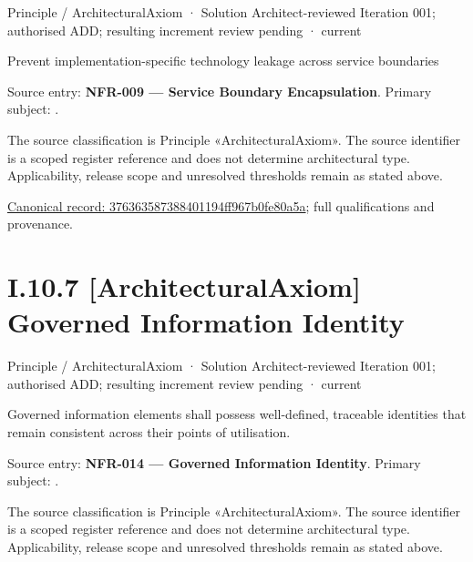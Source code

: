 \label{element:376363587388401194ff967b0fe80a5a}
{\small Principle / ArchitecturalAxiom · Solution Architect-reviewed Iteration 001; authorised ADD; resulting increment review pending · current}\par

Prevent implementation-specific technology leakage across service boundaries



Source entry: \textbf{NFR-009 — Service Boundary Encapsulation}. Primary subject: \texttt{}.



The source classification is Principle «ArchitecturalAxiom». The source identifier is a scoped register reference and does not determine architectural type. Applicability, release scope and unresolved thresholds remain as stated above.


{\footnotesize \href{../../../../../../../continuum/motivation/principle/architectural-axiom/376363587388401194ff967b0fe80a5a.md}{Canonical record: 376363587388401194ff967b0fe80a5a}; full qualifications and provenance.}\par
\section*{I.10.7 [ArchitecturalAxiom] Governed Information Identity}
\label{navigation:I.10.7}

\label{element:c2e7ee7597e64275b3523befd72c0987}
{\small Principle / ArchitecturalAxiom · Solution Architect-reviewed Iteration 001; authorised ADD; resulting increment review pending · current}\par

Governed information elements shall possess well-defined, traceable identities that remain consistent across their points of utilisation.



Source entry: \textbf{NFR-014 — Governed Information Identity}. Primary subject: \texttt{}.



The source classification is Principle «ArchitecturalAxiom». The source identifier is a scoped register reference and does not determine architectural type. Applicability, release scope and unresolved thresholds remain as stated above.


